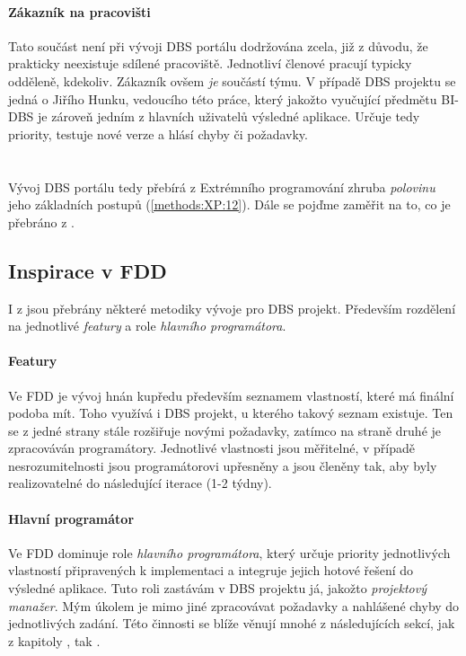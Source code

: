 \paragraph{Zákazník na pracovišti}
Tato součást není při vývoji DBS portálu dodržována zcela, již z důvodu, že prakticky neexistuje sdílené pracoviště. Jednotliví členové pracují typicky odděleně, kdekoliv.
Zákazník ovšem \emph{je} součástí týmu. V případě DBS projektu se jedná o Jiřího Hunku, vedoucího této práce, který jakožto vyučující předmětu BI-DBS je zároveň jedním z hlavních uživatelů výsledné aplikace. Určuje tedy priority, testuje nové verze a hlásí chyby či požadavky.
\\
\\
\\
Vývoj DBS portálu tedy přebírá z Extrémního programování zhruba \emph{polovinu} jeho základních postupů (\ref{methods:XP:12}). Dále se pojďme zaměřit na to, co je přebráno z .


\subsection{Inspirace v FDD}

I z  jsou přebrány některé metodiky vývoje pro DBS projekt. Především rozdělení na jednotlivé \emph{featury} a role \emph{hlavního programátora}.

\paragraph{Featury} Ve FDD je vývoj hnán kupředu především seznamem vlastností, které má finální podoba mít. Toho využívá i DBS projekt, u kterého takový seznam existuje. Ten se z jedné strany stále rozšiřuje novými požadavky, zatímco na straně druhé je zpracováván programátory. Jednotlivé vlastnosti jsou měřitelné, v případě nesrozumitelnosti jsou programátorovi upřesněny a jsou členěny tak, aby byly realizovatelné do následující iterace (1-2 týdny).

\paragraph{Hlavní programátor}
Ve FDD dominuje role \emph{hlavního programátora}, který určuje priority jednotlivých vlastností připravených k implementaci a integruje jejich hotové řešení do výsledné aplikace. Tuto roli zastávám v DBS projektu já, jakožto \emph{projektový manažer}. Mým úkolem je mimo jiné zpracovávat požadavky a nahlášené chyby do jednotlivých zadání. Této činnosti se blíže věnují mnohé z následujících sekcí, jak z kapitoly , tak .
